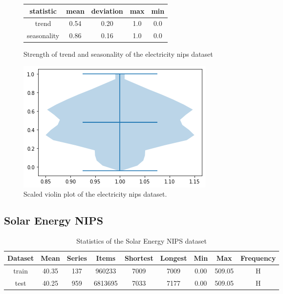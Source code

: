 \begin{figure}[htb]
    \centering
        \begin{center}
            \begin{tabular}{||c | c | c | c | c |} 
                \hline
                statistic & mean & deviation & max & min\\
                \hline
                trend & 0.54 & 0.20 & 1.0 & 0.0 \\
                \hline
                seasonality & 0.86 & 0.16 & 1.0 & 0.0 \\
                \hline
                \hline
            \end{tabular}
            \caption{Strength of trend and seasonality of the electricity nips dataset}
        \end{center}
    \endminipage\hfill
      \includegraphics[width=\linewidth]{4_designing/figures/electricity_nips_violin.png}
      \caption{Scaled violin plot of the electricity nips dataset.}
      \label{fig:electricity_nips_violin}
    \endminipage\hfill
\end{figure}

\clearpage
\subsection{Solar Energy NIPS}
\begin{table}[htb]
    \begin{tabular}{||c | c c c c c c c c ||} 
        \hline
       Dataset & Mean & Series & Items & Shortest & Longest & Min & Max & Frequency\\ [0.5ex] 
        \hline\hline
        train & 40.35 & 137 & 960233 & 7009 & 7009 & 0.00 & 509.05 & H\\ 
        \hline
        test & 40.25 & 959 & 6813695 & 7033 & 7177 & 0.00 & 509.05 & H\\
        \hline
    \end{tabular}
   \caption{Statistics of the Solar Energy NIPS dataset}
\end{table}

